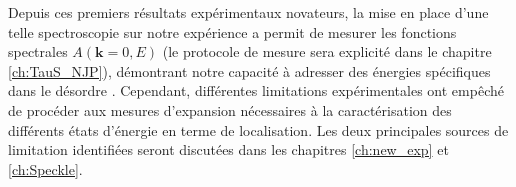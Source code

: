 Depuis ces premiers résultats expérimentaux novateurs, la mise en place d'une telle spectroscopie sur notre expérience a permit de mesurer les fonctions spectrales $A(\mathbf{k}=0,E)$ (le protocole de mesure sera explicité dans le chapitre \ref{ch:TauS_NJP}), démontrant notre capacité à adresser des énergies spécifiques dans le désordre \citep{volchkov2018measurement}. Cependant, différentes limitations expérimentales ont empêché de procéder aux mesures d'expansion nécessaires à la caractérisation des différents états d'énergie en terme de localisation. Les deux principales sources de limitation identifiées seront discutées dans les chapitres \ref{ch:new_exp} et \ref{ch:Speckle}.


